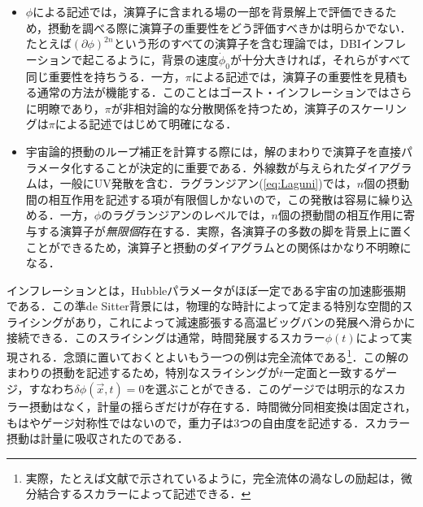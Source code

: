 \begin{itemize}
\item $\phi$による記述では，演算子に含まれる場の一部を背景解上で評価できるため，摂動を調べる際に演算子の重要性をどう評価すべきかは明らかでない．たとえば$(\partial\phi)^{2n}$という形のすべての演算子を含む理論では，DBIインフレーションで起こるように，背景の速度$\dot\phi_0$が十分大きければ，それらがすべて同じ重要性を持ちうる．一方，$\pi$による記述では，演算子の重要性を見積もる通常の方法が機能する．このことはゴースト・インフレーションではさらに明瞭であり，$\pi$が非相対論的な分散関係を持つため，演算子のスケーリングは$\pi$による記述ではじめて明確になる．

\item 宇宙論的摂動のループ補正を計算する際には，解のまわりで演算子を直接パラメータ化することが決定的に重要である．外線数が与えられたダイアグラムは，一般にUV発散を含む．ラグランジアン(\ref{eq:Laguni})では，$n$個の摂動間の相互作用を記述する項が有限個しかないので，この発散は容易に繰り込める．一方，$\phi$のラグランジアンのレベルでは，$n$個の摂動間の相互作用に寄与する演算子が\emph{無限個}存在する．実際，各演算子の多数の脚を背景上に置くことができるため，演算子と摂動のダイアグラムとの関係はかなり不明瞭になる．
\end{itemize}

インフレーションとは，Hubbleパラメータがほぼ一定である宇宙の加速膨張期である．この準de Sitter背景には，物理的な時計によって定まる特別な空間的スライシングがあり，これによって減速膨張する高温ビッグバンの発展へ滑らかに接続できる．このスライシングは通常，時間発展するスカラー$\phi(t)$によって実現される．念頭に置いておくとよいもう一つの例は完全流体である\footnote{実際，たとえば文献\cite{Dubovsky:2005xd}で示されているように，完全流体の渦なしの励起は，微分結合するスカラーによって記述できる．}．この解のまわりの摂動を記述するため，特別なスライシングが$t$一定面と一致するゲージ，すなわち$\delta\phi(\vec x,t)=0$を選ぶことができる．このゲージでは明示的なスカラー摂動はなく，計量の揺らぎだけが存在する．時間微分同相変換は固定され，もはやゲージ対称性ではないので，重力子は3つの自由度を記述する．スカラー摂動は計量に吸収されたのである．

